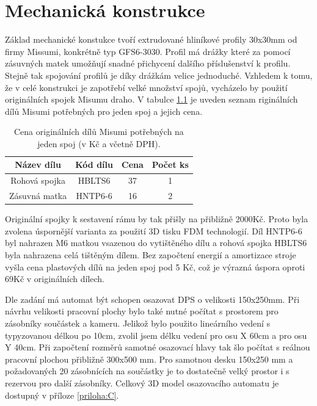\chapter{Mechanická konstrukce}

Základ mechanické konstukce tvoří extrudované hliníkové profily 30x30mm od firmy Missumi, konkrétně typ GFS6-3030. Profil má drážky které za pomocí zásuvných matek umožňují snadné přichycení dalšího příslušenství k profilu. Stejně tak spojování profilů je díky drážkám velice jednoduché. Vzhledem k tomu, že v celé konstrukci je zapotřebí velké množství spojů, vycházelo by použití originálních spojek Misumu draho. V tabulce \ref{table:ceny} je uveden seznam riginálních dílů Misumi potřebných pro jeden spoj a  jejich cena.

\begin{table}[h!]
  \caption{Cena originálních dílů Misumi potřebných na jeden spoj (v Kč a včetně DPH). }
  \label{table:ceny}
  \begin{center}
  	\small
	  \begin{tabular}{|c|c|c|c|}
	    \hline
	    	Název dílu	& Kód dílu	& Cena		&Počet ks	\\
	    \hline\hline

		Rohová spojka 	& HBLTS6	& 37		& 1		\\
		\hline
		Zásuvná matka 	& HNTP6-6 	& 16		& 2		\\
		\hline
	    \hline
	  \end{tabular}
  \end{center}
\end{table}


Originální spojky k sestavení rámu by tak přišly na přibližně 2000Kč. Proto byla zvolena úspornější varianta za použití 3D tisku FDM technologií. Díl HNTP6-6 byl nahrazen M6 matkou vsazenou do vytištěného dílu a rohová spojka HBLTS6 byla nahrazena celá tištěným dílem. Bez započtení energií a amortizace stroje vyšla cena plastových dílů na jeden spoj pod 5 Kč, což je výrazná úspora oproti 69Kč v originálních dílech.

Dle zadání má automat být schopen osazovat DPS o velikosti 150x250mm. Při návrhu velikosti pracovní plochy bylo také nutné počítat s prostorem pro zásobníky součástek a kameru. Jelikož bylo použito lineárního vedení s typyzovanou délkou po 10cm, zvolil jsem délku vedení pro osu X 60cm a pro osu Y 40cm. Při započtení rozměrů samotné osazovací hlavy tak šlo počítat s reálnou pracovní plochou přibližně 300x500 mm. Pro samotnou desku 150x250 mm a požadovaných 20 zásobnících na součástky je to dostatečně velký prostor i s rezervou pro další zásobníky.
Celkový 3D model osazovacího automatu je dostupný v příloze \ref{priloha:C}.



